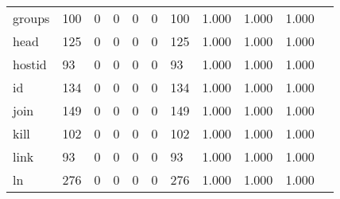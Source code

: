 \begin{longtable}{lp{1.10cm}p{1.10cm}p{1.10cm}p{1.10cm}p{1.10cm}p{1.10cm}p{1.10cm}p{1.10cm}p{1.10cm}p{1.10cm}}
groups    &                    100 &                                  0 &                                 0 &                                0 &                                 0 &                             100 &                          1.000 &                                 1.000 &                               1.000 \\
head      &                    125 &                                  0 &                                 0 &                                0 &                                 0 &                             125 &                          1.000 &                                 1.000 &                               1.000 \\
hostid    &                     93 &                                  0 &                                 0 &                                0 &                                 0 &                              93 &                          1.000 &                                 1.000 &                               1.000 \\
id        &                    134 &                                  0 &                                 0 &                                0 &                                 0 &                             134 &                          1.000 &                                 1.000 &                               1.000 \\
join      &                    149 &                                  0 &                                 0 &                                0 &                                 0 &                             149 &                          1.000 &                                 1.000 &                               1.000 \\
kill      &                    102 &                                  0 &                                 0 &                                0 &                                 0 &                             102 &                          1.000 &                                 1.000 &                               1.000 \\
link      &                     93 &                                  0 &                                 0 &                                0 &                                 0 &                              93 &                          1.000 &                                 1.000 &                               1.000 \\
ln        &                    276 &                                  0 &                                 0 &                                0 &                                 0 &                             276 &                          1.000 &                                 1.000 &                               1.000 \\

\end{longtable}
